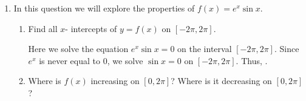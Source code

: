 \documentclass{article}
\begin{document}
\begin{enumerate}
\begin{enumerate}
\begin{enumerate}
    At the moment when the lion is $40$ feet from the meerkat and getting closer, at what rate is the distance between the lion and the meerkat shrinking?
    
    \begin{solution}
        Let's relate the variables $y$ and $z$ since we are looking for $\frac{dz}{dt}$ when $z=40$ and we know $\frac{dy}{dt}$.
    \begin{align*}
        20^2+y^2=z^2
    \end{align*}
    Now, let's differentiate with respect to time and plug in information we know in the moment when $z=40$ to solve for $\frac{dz}{dt}$.
    \begin{align*}
        \frac{d}{dt}(20^2+y^2)&=\frac{d}{dt}(z^2) \\
        2y\frac{dy}{dt}&=2z\frac{dz}{dt} \\
        y\frac{dy}{dt}&=z\frac{dz}{dt} \\
        (\sqrt{1200})(-60)&=40\frac{dz}{dt} \\
        \frac{dz}{dt}&=\frac{(\sqrt{1200})(-60)}{40}\\
        &=-30\sqrt{3}\text{ feet per second}
    \end{align*}
    \end{solution}
    \vfill


\end{enumerate}
\end{enumerate}
\newpage
\begin{workshop}
    This question (\#6a-c) is an exam-type problem. Even if most students don't get to it, feel free to preview it with students and encourage them to complete it on their own time.
\end{workshop}
    \item In this question we will explore the properties of $f(x)=e^x\sin x$.
    \begin{enumerate}
    \item Find all $x$- intercepts of $y=f(x)$ on $[-2\pi, 2\pi]$. 


    \begin{solution}
    Here we solve the equation $e^x\sin x=0$ on the interval $[-2\pi, 2\pi]$. Since $e^x$ is never equal to $0$, we solve $\sin x =0$ on $[-2\pi, 2\pi]$. Thus, .
    \end{solution}
    \vfill
    \item Where is $f(x)$ increasing on $[0, 2\pi]$? Where is it decreasing on $[0, 2\pi]$?
    

\end{enumerate}
\end{enumerate}
\end{document}
